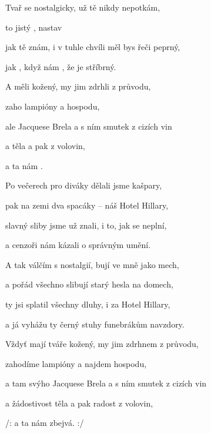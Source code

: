 

\zs
Tvař se  nostalgicky, už tě nikdy nepotkám, 

 to jistý , nastav 

jak tě znám, i v tuhle chvíli měl bys řeči peprný,  

jak , když nám , že je  stříbrný.  
\ks

\zr
A  měli kožený, my jim zdrhli z průvodu,

zaho lampióny a  hospodu,

ale  Jacquese Brela a s ním smutek z cizích vin

a  těla a pak  z volovin,

a ta nám .
\kr

\zs
Po večerech pro diváky dělali jsme kašpary,

pak na zemi dva spacáky -- náš Hotel Hillary,

slavný sliby jsme už znali, i to, jak se neplní,

a cenzoři nám kázali o správným umění.
\ks

\zr  \kr

\zs
A tak válčím s nostalgií, bují ve mně jako mech,

a pořád všechno slibují starý hesla na domech,

ty jsi splatil všechny dluhy, i za Hotel Hillary,

a já vyhážu ty černý stuhy funebrákům navzdory.
\ks

\zr
Vždyť mají tváře kožený, my jim zdrhnem z průvodu,

zahodíme lampióny a najdem hospodu,

a tam svýho Jacquese Brela a s ním smutek z cizích vin

a žádostivost těla a pak radost z volovin,

/: a ta nám zbejvá. :/
\kr

\kp





